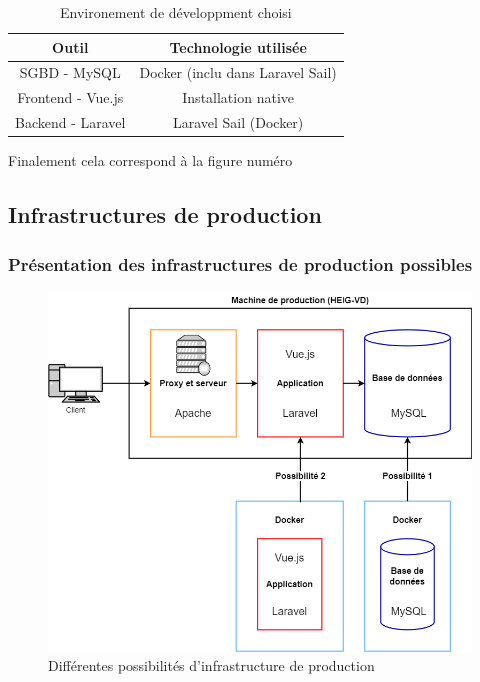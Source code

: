 \documentclass[
    iai, %
    il, %
]{heig-tb}
\begin{document}
\begin{table}[h]
    \begin{center}
        \caption{Environement de développment choisi \label{env-dev}}
        \begin{tabular}{c|c}
            Outil             & Technologie utilisée             \\ \hline
            SGBD - MySQL      & Docker (inclu dans Laravel Sail) \\
            Frontend - Vue.js & Installation native              \\
            Backend - Laravel & Laravel Sail (Docker)            \\
        \end{tabular}
    \end{center}
\end{table}

Finalement cela correspond à la figure numéro %

\clearpage
\subsection{Infrastructures de production}

\subsubsection{Présentation des infrastructures de production possibles}

\begin{center}
    \begin{figure}
        \includegraphics[width=\textwidth]{./assets/figures/infrastructure-prod-choix.drawio.png}
        \caption{Différentes possibilités d'infrastructure de production \label{infrastructure-prod-choix.drawio}}
    \end{figure}
\end{center}
\end{document}
